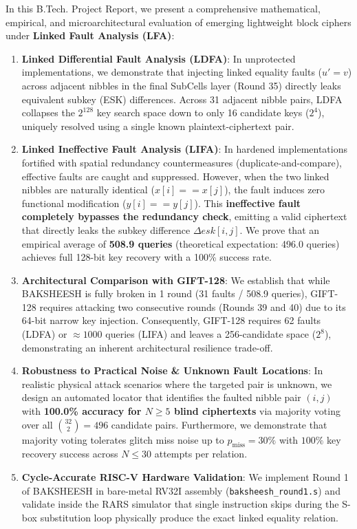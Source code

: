 \documentclass[12pt,a4paper,oneside]{report}
\begin{document}
In this B.Tech. Project Report, we present a comprehensive mathematical, empirical, and microarchitectural evaluation of emerging lightweight block ciphers under \textbf{Linked Fault Analysis (LFA)}:
\begin{enumerate}
    \item \textbf{Linked Differential Fault Analysis (LDFA)}: In unprotected implementations, we demonstrate that injecting linked equality faults ($u' = v$) across adjacent nibbles in the final SubCells layer (Round 35) directly leaks equivalent subkey (ESK) differences. Across 31 adjacent nibble pairs, LDFA collapses the $2^{128}$ key search space down to only 16 candidate keys ($2^4$), uniquely resolved using a single known plaintext-ciphertext pair.
    \item \textbf{Linked Ineffective Fault Analysis (LIFA)}: In hardened implementations fortified with spatial redundancy countermeasures (duplicate-and-compare), effective faults are caught and suppressed. However, when the two linked nibbles are naturally identical ($x[i] == x[j]$), the fault induces zero functional modification ($y[i] == y[j]$). This \textbf{ineffective fault completely bypasses the redundancy check}, emitting a valid ciphertext that directly leaks the subkey difference $\Delta esk[i, j]$. We prove that an empirical average of \textbf{508.9 queries} (theoretical expectation: 496.0 queries) achieves full 128-bit key recovery with a 100\% success rate.
    \item \textbf{Architectural Comparison with GIFT-128}: We establish that while BAKSHEESH is fully broken in 1 round (31 faults / 508.9 queries), GIFT-128 requires attacking two consecutive rounds (Rounds 39 and 40) due to its 64-bit narrow key injection. Consequently, GIFT-128 requires 62 faults (LDFA) or $\approx 1000$ queries (LIFA) and leaves a 256-candidate space ($2^8$), demonstrating an inherent architectural resilience trade-off.
    \item \textbf{Robustness to Practical Noise \& Unknown Fault Locations}: In realistic physical attack scenarios where the targeted pair is unknown, we design an automated locator that identifies the faulted nibble pair $(i, j)$ with \textbf{100.0\% accuracy for $N \ge 5$ blind ciphertexts} via majority voting over all $\binom{32}{2} = 496$ candidate pairs. Furthermore, we demonstrate that majority voting tolerates glitch miss noise up to $p_{\text{miss}} = 30\%$ with $100\%$ key recovery success across $N \le 30$ attempts per relation.
    \item \textbf{Cycle-Accurate RISC-V Hardware Validation}: We implement Round 1 of BAKSHEESH in bare-metal RV32I assembly (\texttt{baksheesh\_round1.s}) and validate inside the RARS simulator that single instruction skips during the S-box substitution loop physically produce the exact linked equality relation.

\end{enumerate}
\end{document}
